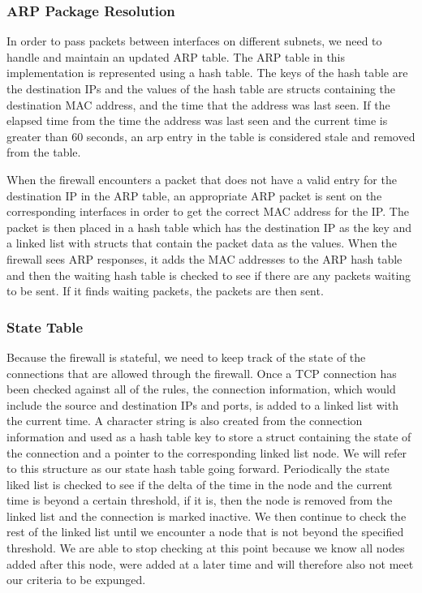 \documentclass[12pt]{article} %
\begin{document}

\subsubsection{ARP Package Resolution} %
In order to pass packets between interfaces on different subnets, we need to handle and maintain
an updated ARP table. The ARP table in this implementation is represented using a hash table. The keys
of the hash table are the destination IPs and the values of the hash table are structs containing the destination 
MAC address, and the time that the address was last seen. If the elapsed time from the time the address was last seen 
and the current time is greater than 60 seconds, an arp entry in the table is considered stale and removed from the table.


When the firewall encounters a packet that does not have a valid entry for the destination IP in the ARP table, an appropriate
ARP packet is sent on the corresponding interfaces in order to get the correct MAC address for the IP. The packet is then placed 
in a hash table which has the destination IP as the key and a linked list with structs that contain the packet data as the values.
When the firewall sees ARP responses, it adds the MAC addresses to the ARP hash table and then the waiting hash table is checked to 
see if there are any packets waiting to be sent. If it finds waiting packets, the packets are then sent. 


\subsubsection{State Table}
Because the firewall is stateful, we need to keep track of the state of the connections that are allowed through the firewall. 
Once a TCP connection has been checked against all of the rules, the connection information, which would include the source
and destination IPs and ports, is added to a linked list with the current time. A character string is also created from the connection 
information and used as a hash table key to store a struct containing the state of the connection and a pointer to the 
corresponding linked list node. We will refer to this structure as our state hash table going forward. 
Periodically the state liked list is checked to see if the delta of the time in the node and the
current time is beyond a certain threshold, if it is, then the node is removed from the linked list and the connection is marked inactive. We then continue
to check the rest of the linked list until we encounter a node that is not beyond the specified threshold. We are able to stop checking at this point because 
we know all nodes added after this node, were added at a later time and will therefore also not meet our criteria to be expunged.
\end{document}
